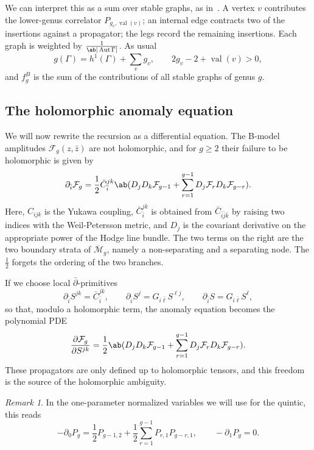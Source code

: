 \documentclass{amsart}
\theoremstyle{definition}
\theoremstyle{remark}
\newtheorem{rmk}[thm]{Remark}
\theoremstyle{plain}
\theoremstyle{definition}
\theoremstyle{remark}
\newcommand{\Mbar}{\overline{\mathcal{M}}}
\newcommand{\mc}[1]{\mathcal{#1}}
\newcommand{\on}[1]{\operatorname{#1}}
\newcommand{\1}{\mathbf{1}}
\newcommand{\2}{\mathbf{2}}
\newcommand{\3}{\mathbf{3}}
\DeclareMathOperator{\Aut}{Aut}
\begin{document}
We can interpret this as a sum over stable graphs, as in~. A vertex \(v\) contributes the lower-genus correlator \(P_{g_v, \on{val}(v)}\); an internal edge contracts two of the insertions against a propagator; the legs record the remaining insertions. Each graph is weighted by \(\frac{1}{\ab|\Aut \Gamma|}\). As usual
\[ g(\Gamma) = h^1(\Gamma) + \sum_v g_v, \qquad 2g_v - 2 + \on{val}(v) > 0, \]
and \(f_g^B\) is the sum of the contributions of all stable graphs of genus \(g\).

\subsection{The holomorphic anomaly equation}%
\label{sub:The holomorphic anomaly equation}

We will now rewrite the recursion as a differential equation. The B-model amplitudes \(\mc{F}_g(z,\bar{z})\) are not holomorphic, and for \(g \geq 2\) their failure to be holomorphic is given by
\[ \partial_{\bar{i}} \mc{F}_g = \frac{1}{2}\bar{C}_{\bar{i}}^{jk}\ab( D_j D_k \mc{F}_{g-1} + \sum_{r=1}^{g-1} D_j \mc{F}_r D_k \mc{F}_{g-r} ). \]
Here, \(C_{ijk}\) is the Yukawa coupling, \(\bar{C}_{\bar{i}}^{jk}\) is obtained from \(\bar{C}_{\bar{i}\bar{j}\bar{k}}\) by raising two indices with the Weil-Petersson metric, and \(D_j\) is the covariant derivative on the appropriate power of the Hodge line bundle. The two terms on the right are the two boundary strata of \(\Mbar_g\), namely a non-separating and a separating node. The \(\frac{1}{2}\) forgets the ordering of the two branches.

If we choose local \(\bar{\partial}\)-primitives
\[ \partial_{\bar{i}}S^{jk} = \bar{C}_{\bar{i}}^{jk}, \qquad \partial_{\bar{i}}S^j = G_{i\bar{\ell}}S^{\ell j}, \qquad \partial_{\bar{i}}S = G_{i\bar{\ell}}S^{\ell}, \]
so that, modulo a holomorphic term, the anomaly equation becomes the polynomial PDE
\[ \pdv{\mc{F}_g}{S^{jk}} = \frac{1}{2}\ab( D_jD_k \mc{F}_{g-1} + \sum_{r=1}^{g-1} D_j \mc{F}_r D_k \mc{F}_{g-r} ). \]
These propagators are only defined up to holomorphic tensors, and this freedom is the source of the holomorphic ambiguity.

\begin{rmk}
    In the one-parameter normalized variables we will use for the quintic, this reads
    \[ -\partial_0 P_g = \frac{1}{2}P_{g-1,2} + \frac{1}{2}\sum_{r=1}^{g-1}P_{r,1}P_{g-r,1}, \qquad -\partial_1 P_g = 0. \]
\end{rmk}
\end{document}
